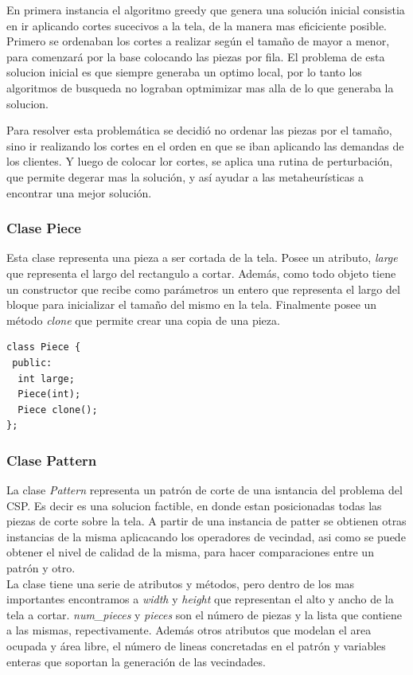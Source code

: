 \documentclass[letterpaper,11pt]{article}
\begin{document}
En primera instancia el algoritmo greedy que genera una soluci\'on inicial consistia en ir aplicando cortes sucecivos a la tela, de la manera mas eficiciente posible. Primero se ordenaban los cortes a realizar seg\'un el tamaño de mayor a menor, para comenzar\'a por la base colocando las piezas por fila. El problema de esta solucion inicial
es que siempre generaba un optimo local, por lo tanto los algoritmos de busqueda no lograban optmimizar mas alla
de lo que generaba la solucion.

Para resolver esta problem\'atica se decidi\'o no ordenar las piezas por el tama\~no, sino ir realizando
los cortes en el orden en que se iban aplicando las demandas de los clientes. Y luego de colocar lor cortes, 
se aplica una rutina de perturbaci\'on, que permite degerar mas la soluci\'on, y as\'i ayudar a las metaheur\'isticas
a encontrar una mejor soluci\'on.

\subsubsection{Clase Piece}

Esta clase representa una pieza a ser cortada de la tela. Posee un atributo, \emph{large} que representa
el largo del rectangulo a cortar. Adem\'as, como todo objeto tiene un constructor que recibe como par\'ametros un entero que representa el largo del bloque para inicializar el tama\~no del mismo en la tela. Finalmente posee un m\'etodo \emph{clone} que permite crear una copia de una pieza.

\begin{verbatim}
class Piece {
 public:
  int large;
  Piece(int);
  Piece clone();
};
\end{verbatim}

\subsubsection{Clase Pattern}

La clase \emph{Pattern} representa un patr\'on de corte de una isntancia del problema del CSP. Es decir es
una solucion factible, en donde estan posicionadas todas las piezas de corte sobre la tela. A partir de una
instancia de patter se obtienen otras instancias de la misma aplicacando los operadores de vecindad, asi como
se puede obtener el nivel de calidad de la misma, para hacer comparaciones entre un patr\'on y otro.\\

La clase tiene una serie de atributos y m\'etodos, pero dentro de los mas importantes encontramos a \emph{width} y
\emph{height} que representan el alto y ancho de la tela a cortar. \emph{num\_pieces} y \emph{pieces} son el n\'umero
de piezas y la lista que contiene a las mismas, repectivamente. Adem\'as otros atributos que modelan el area ocupada
y \'area libre, el n\'umero de lineas concretadas en el patr\'on y variables enteras que soportan la generaci\'on de las
vecindades.\\
\end{document}
